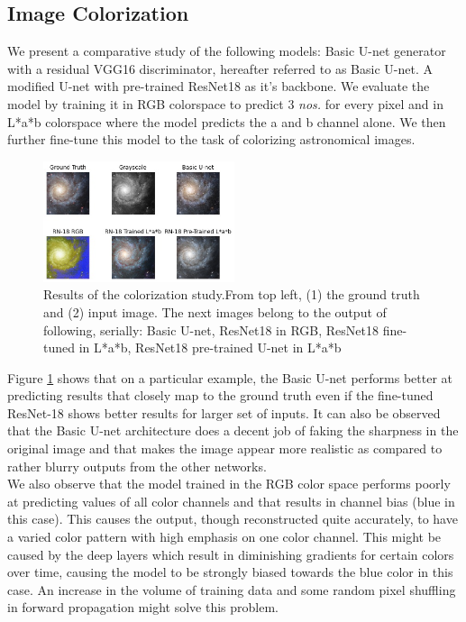 \documentclass{article} %
\begin{document}
    \subsection{Image Colorization}
    \hspace*{0.167 in}We present a comparative study of the following models: Basic U-net generator with a residual VGG16 discriminator, hereafter referred to as Basic U-net. A modified U-net with pre-trained ResNet18 as it's backbone. We evaluate the model by training it in RGB colorspace to predict 3 \textit{nos.} for every pixel and in L*a*b colorspace where the model predicts the a and b channel alone. We then further fine-tune this model to the task of colorizing astronomical images.
    \begin{figure}[!htb]
    \centering
    	\includegraphics[width=0.5\textwidth]{figures/comparison_color}
    	\caption{Results of the colorization study.From top left, (1) the ground truth and (2) input image. The next images belong to the output of following, serially: Basic U-net, ResNet18 in RGB, ResNet18 fine-tuned in L*a*b, ResNet18 pre-trained U-net in L*a*b}
    	\label{color_results}
    \end{figure}
    Figure \ref{color_results} shows that on a particular example, the Basic U-net performs better at predicting results that closely map to the ground truth even if the fine-tuned ResNet-18 shows better results for larger set of inputs. It can also be observed that the Basic U-net architecture does a decent job of faking the sharpness in the original image and that makes the image appear more realistic as compared to rather blurry outputs from the other networks. \\
   \hspace*{0.167 in}We also observe that the model trained in the RGB color space performs poorly at predicting values of all color channels and that results in channel bias (blue in this case). This causes the output, though reconstructed quite accurately, to have a varied color pattern with high emphasis on one color channel. This might be caused by the deep layers which result in diminishing gradients for certain colors over time, causing the model to be strongly biased towards the blue color in this case. An increase in the volume of training data and some random pixel shuffling in forward propagation might solve this problem. \\
\end{document}
